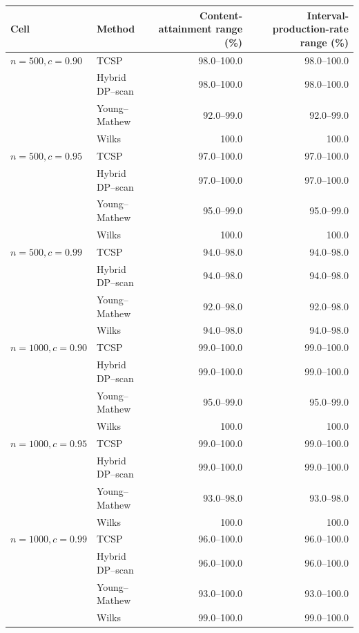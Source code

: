 \begin{tabularx}{\textwidth}{@{}l>{\raggedright\arraybackslash}Xrr@{}}
\toprule
Cell & Method & Content-attainment range (\%) & Interval-production-rate range (\%)\\
\midrule
\(n=500,c=0.90\) & TCSP & 98.0--100.0 & 98.0--100.0 \\
 & Hybrid DP--scan & 98.0--100.0 & 98.0--100.0 \\
 & Young--Mathew & 92.0--99.0 & 92.0--99.0 \\
 & Wilks & 100.0 & 100.0 \\
\addlinespace[0.25em]
\(n=500,c=0.95\) & TCSP & 97.0--100.0 & 97.0--100.0 \\
 & Hybrid DP--scan & 97.0--100.0 & 97.0--100.0 \\
 & Young--Mathew & 95.0--99.0 & 95.0--99.0 \\
 & Wilks & 100.0 & 100.0 \\
\addlinespace[0.25em]
\(n=500,c=0.99\) & TCSP & 94.0--98.0 & 94.0--98.0 \\
 & Hybrid DP--scan & 94.0--98.0 & 94.0--98.0 \\
 & Young--Mathew & 92.0--98.0 & 92.0--98.0 \\
 & Wilks & 94.0--98.0 & 94.0--98.0 \\
\addlinespace[0.25em]
\(n=1000,c=0.90\) & TCSP & 99.0--100.0 & 99.0--100.0 \\
 & Hybrid DP--scan & 99.0--100.0 & 99.0--100.0 \\
 & Young--Mathew & 95.0--99.0 & 95.0--99.0 \\
 & Wilks & 100.0 & 100.0 \\
\addlinespace[0.25em]
\(n=1000,c=0.95\) & TCSP & 99.0--100.0 & 99.0--100.0 \\
 & Hybrid DP--scan & 99.0--100.0 & 99.0--100.0 \\
 & Young--Mathew & 93.0--98.0 & 93.0--98.0 \\
 & Wilks & 100.0 & 100.0 \\
\addlinespace[0.25em]
\(n=1000,c=0.99\) & TCSP & 96.0--100.0 & 96.0--100.0 \\
 & Hybrid DP--scan & 96.0--100.0 & 96.0--100.0 \\
 & Young--Mathew & 93.0--100.0 & 93.0--100.0 \\
 & Wilks & 99.0--100.0 & 99.0--100.0 \\
\bottomrule
\end{tabularx}
